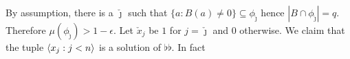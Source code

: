 \documentclass[sputnik.tex]{subfiles}
\begin{document}
% 
% 
By assumption, there is a $\check\jmath$ such that $\big\{a:B(a)\neq0\big\}\subseteq\phi_{\check\jmath}$ hence $|B\cap\phi_{\check\jmath}|=q$.
Therefore $\mu(\phi_{\check\jmath})>1-\epsilon$.
Let $\check x_j$ be $1$ for $j=\check\jmath$ and $0$ otherwise.
We claim that the tuple $\langle x_j:j<n\rangle$ is a solution of $\flat\flat$.
In fact
% 
% 
\end{document}

